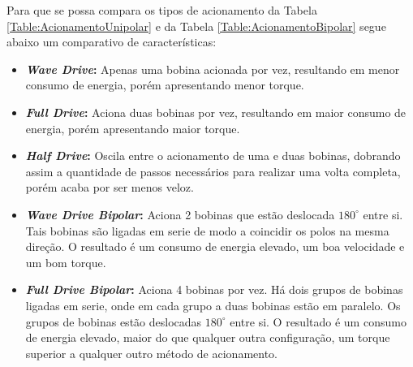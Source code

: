 \begin{table}[H]
\begin{tabular}{|cccc|}
		\hline
	\end{tabular}
\end{table} 

Para que se possa compara os tipos de acionamento da Tabela \ref{Table:AcionamentoUnipolar} e da Tabela \ref{Table:AcionamentoBipolar} segue abaixo um comparativo de características:

\begin{itemize}
	\item \textbf{\textit{Wave Drive}:} Apenas uma bobina acionada por vez, resultando em  menor consumo de energia, porém apresentando menor torque.
	\item \textbf{\textit{Full Drive}:} Aciona duas bobinas por vez, resultando em  maior consumo de energia, porém apresentando maior torque.
	\item \textbf{\textit{Half Drive}:} Oscila entre o acionamento de uma e duas bobinas, dobrando assim a  quantidade de passos necessários para realizar uma volta completa, porém acaba por ser menos veloz.
	\item \textbf{\textit{Wave Drive Bipolar}:} Aciona 2 bobinas que estão deslocada $180^{\circ}$ entre si. Tais bobinas são ligadas em serie de modo a coincidir os polos na mesma direção. O resultado é um consumo de energia elevado, um boa velocidade e um bom torque.
	\item \textbf{\textit{Full Drive Bipolar}:} Aciona 4 bobinas por vez. Há dois grupos de bobinas ligadas em serie, onde em cada grupo a duas bobinas estão em paralelo. Os grupos de bobinas estão deslocadas $180^{\circ}$ entre si.  O resultado é um consumo de energia elevado, maior do que qualquer outra configuração,  um torque superior a qualquer outro método de acionamento.
\end{itemize}
